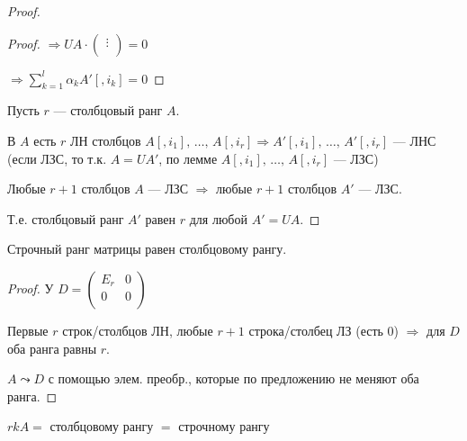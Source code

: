 \begin{theorem-non}
\begin{proof}
\begin{lemma}
\begin{proof}
                $\Longrightarrow UA \cdot
                \begin{pmatrix}
                    \vdots\\
                \end{pmatrix}
                = 0$

                $\Longrightarrow \sum_{k=1}^l \alpha_k A'[, i_k] = 0$

            \end{proof}
        \end{lemma}

        Пусть $r$ --- столбцовый ранг $A$. 
        
        В $A$ есть $r$ ЛН столбцов $A[, i_1],\, \dots,\, A[, i_r] \Longrightarrow A'[, i_1],\, \dots,\, A'[, i_r]$ --- ЛНС 
        (если ЛЗС, то т.к. $A = UA'$, по лемме $A[, i_1],\, \dots,\, A[, i_r]$ --- ЛЗС)

        Любые $r+1$ столбцов $A$ --- ЛЗС $\Longrightarrow$ любые $r+1$ столбцов $A'$ --- ЛЗС.

        Т.е. столбцовый ранг $A'$ равен $r$ для любой $A'=UA$.

    \end{proof}
\end{theorem-non}

\follow Строчный ранг матрицы равен столбцовому рангу.
\begin{proof}
    
    У $D = 
    \begin{pmatrix}
        E_r & 0\\
        0   & 0\\
    \end{pmatrix}$

    Первые $r$ строк/столбцов ЛН, любые $r+1$ строка/столбец ЛЗ (есть 0) $\Longrightarrow$ для $D$ оба ранга равны $r$.

    $A \leadsto D$ с помощью элем. преобр., которые по предложению не меняют оба ранга.

\end{proof}

$rk A =$ столбцовому рангу $=$ строчному рангу
